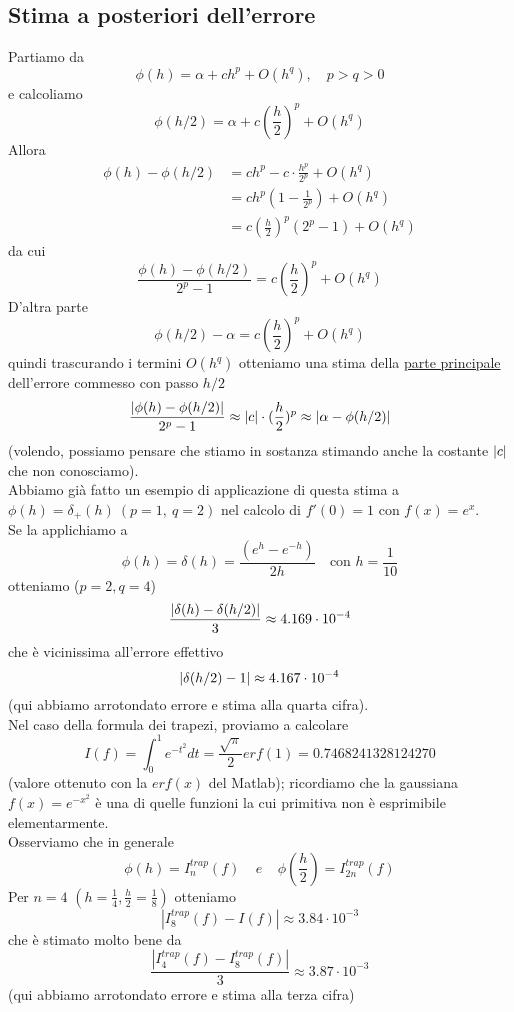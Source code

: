 \documentclass[12pt,a4paper]{article}
\DeclarePairedDelimiter{\abs}{\lvert}{\rvert}
\begin{document}
\subsection{Stima a posteriori dell'errore}
Partiamo da
\[
\phi (h) = \alpha + ch^p + O(h^q), \quad p>q>0
\]
e calcoliamo
\[
\phi (h/2) = \alpha + c(\frac{h}{2})^p + O(h^q)
\]
Allora
\[
\begin{split}
\phi (h) - \phi (h/2) & = ch^p - c \cdot \frac{h^p}{2^p} + O(h^q) \\
& = ch^p (1 - \frac{1}{2^p}) + O(h^q) \\
& = c(\frac{h}{2})^p (2^p-1) + O(h^q)
\end{split}
\]
da cui
\[
\frac{\phi (h) - \phi (h/2)}{2^p - 1} = c(\frac{h}{2})^p + O(h^q)
\]
D'altra parte
\[
\phi (h/2) - \alpha = c(\frac{h}{2})^p + O(h^q)
\]
quindi trascurando i termini $O(h^q)$ otteniamo una stima della \uline{parte principale} dell'errore commesso con passo $h/2$
\[
\frac{\abs{\phi (h) - \phi (h/2)}}{2^p-1} \approx \abs{c} \cdot (\frac{h}{2})^p \approx \abs{\alpha - \phi (h/2)}
\]
(volendo, possiamo pensare che stiamo in sostanza stimando anche la costante $\abs{c}$ che non conosciamo).\\
Abbiamo già fatto un esempio
di applicazione di questa stima a $\phi (h) = \delta_+ (h) \ (p=1, \ q=2)$ nel calcolo di $f'(0) = 1$ con $f(x) = e^x$.\\
Se la applichiamo a
\[
\phi (h) = \delta (h) = \frac{(e^h - e^{-h})}{2h} \quad \text{con } h=\frac{1}{10}
\]
otteniamo ($p=2, q=4$)
\[
\frac{\abs{\delta (h) - \delta (h/2)}}{3} \approx 4.169 \cdot 10^{-4}
\]
che è vicinissima all'errore effettivo
\[
\abs{\delta (h/2) - 1} \approx 4.167 \cdot 10^{-4}
\]
(qui abbiamo arrotondato errore e stima alla quarta cifra).\\
Nel caso della formula dei trapezi, proviamo a calcolare 
\begin{equation*}
    I(f)=\int_0^1e^{-t^2}dt=\frac{\sqrt{\pi}}{2}erf(1)=0.7468241328124270
\end{equation*}
(valore ottenuto con la $erf(x)$ del Matlab); ricordiamo che la gaussiana $f(x)=e^{-x^2}$ è una di quelle funzioni la cui primitiva non è esprimibile elementarmente.\\Osserviamo che in generale 
\begin{equation*}
    \phi(h)=I_n^{trap}(f)\  \  \  \  \ e \  \  \  \  \ \phi(\frac{h}{2})=I_{2n}^{trap}(f)
\end{equation*}
Per $n=4$ $(h=\frac{1}{4},\frac{h}{2}=\frac{1}{8})$ otteniamo
\begin{equation*}
    |I_8^{trap}(f)-I(f)|\approx3.84\cdot 10^{-3}
\end{equation*}
che è stimato molto bene da
\begin{equation*}
    \frac{|I_4^{trap}(f)-I_8^{trap}(f)|}{3}\approx3.87\cdot 10^{-3}
\end{equation*}
(qui abbiamo arrotondato errore e stima alla terza cifra)\\\\
\end{document}
